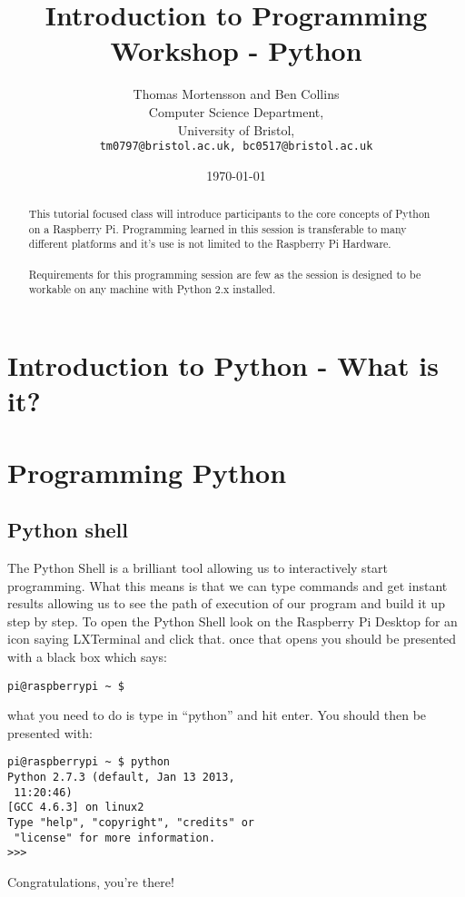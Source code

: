 \documentclass[twocolumn]{article}
\begin{document}
\lstset{language=Python,showstringspaces=false,frame=tlrb}

\title{Introduction to Programming Workshop - Python} 
\author{Thomas Mortensson and Ben Collins\\
        	Computer Science Department,\\
		University of Bristol,\\
		\texttt{tm0797@bristol.ac.uk, 
		bc0517@bristol.ac.uk}} 
\date{\today} 
\maketitle

\begin{abstract}
This tutorial focused class will introduce participants to the core concepts of Python on a Raspberry Pi. Programming learned in this session is transferable to many different platforms and it's use is not limited to the Raspberry Pi Hardware.\\
\\
Requirements for this programming session are  few as the session is designed to be workable on any machine with Python 2.x installed.
\end{abstract}

\section{Introduction to Python - What is it?}

\section {Programming Python}



\subsection{Python shell}

The Python Shell is a brilliant tool allowing us to interactively start programming. What this means is that we can type commands and get instant results allowing us to see the path of execution of our program and build it up step by step. To open the Python Shell look on the Raspberry Pi Desktop for an icon saying LXTerminal and click that. once that opens you should be presented with a black box which says:
\begin{lstlisting}
pi@raspberrypi ~ $
\end{lstlisting}
what you need to do is type in ``python'' and hit enter. You should then be presented with:
\begin{lstlisting}
pi@raspberrypi ~ $ python
Python 2.7.3 (default, Jan 13 2013,
 11:20:46)
[GCC 4.6.3] on linux2
Type "help", "copyright", "credits" or
 "license" for more information.
>>>
\end{lstlisting}
Congratulations, you're there!
\end{document}
